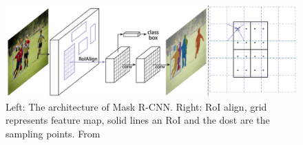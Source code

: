  \begin{figure}
     \centering
     \includegraphics[width=\textwidth]{img/maskrcnn}
     \caption[Mask R-CNN architecture and RoI align layer]%
     {Left: The architecture of Mask R-CNN. Right: RoI align, grid represents feature map, solid lines an RoI and the dost are the sampling points. From \cite[fig. 1, 3]{bib:maskrcnn}}
     \label{fig:maskrcnn}
 \end{figure}

